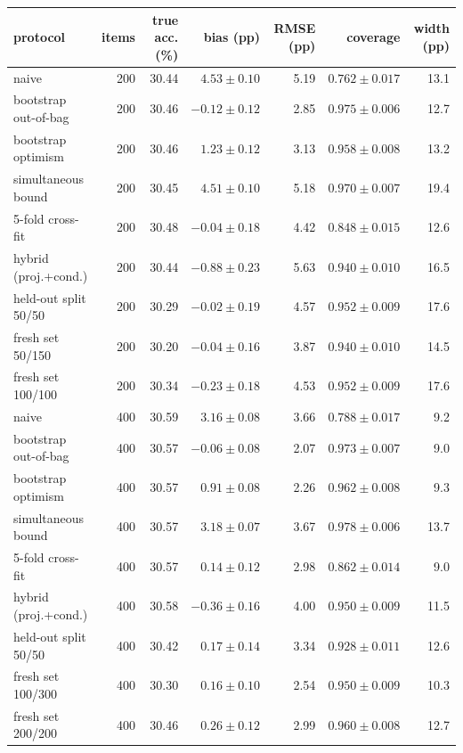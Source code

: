 {\footnotesize\setlength{\tabcolsep}{3.5pt}
\begin{tabular}{lrrrrrr}
\toprule
protocol & items & true acc. (\%) & bias (pp) & RMSE (pp) & coverage & width (pp) \\
\midrule
naive & 200 & 30.44 & $4.53 \pm 0.10$ & 5.19 & $0.762 \pm 0.017$ & 13.1 \\
bootstrap out-of-bag & 200 & 30.46 & $-0.12 \pm 0.12$ & 2.85 & $0.975 \pm 0.006$ & 12.7 \\
bootstrap optimism & 200 & 30.46 & $1.23 \pm 0.12$ & 3.13 & $0.958 \pm 0.008$ & 13.2 \\
simultaneous bound & 200 & 30.45 & $4.51 \pm 0.10$ & 5.18 & $0.970 \pm 0.007$ & 19.4 \\
5-fold cross-fit & 200 & 30.48 & $-0.04 \pm 0.18$ & 4.42 & $0.848 \pm 0.015$ & 12.6 \\
hybrid (proj.+cond.) & 200 & 30.44 & $-0.88 \pm 0.23$ & 5.63 & $0.940 \pm 0.010$ & 16.5 \\
held-out split 50/50 & 200 & 30.29 & $-0.02 \pm 0.19$ & 4.57 & $0.952 \pm 0.009$ & 17.6 \\
fresh set 50/150 & 200 & 30.20 & $-0.04 \pm 0.16$ & 3.87 & $0.940 \pm 0.010$ & 14.5 \\
fresh set 100/100 & 200 & 30.34 & $-0.23 \pm 0.18$ & 4.53 & $0.952 \pm 0.009$ & 17.6 \\
\midrule
naive & 400 & 30.59 & $3.16 \pm 0.08$ & 3.66 & $0.788 \pm 0.017$ & 9.2 \\
bootstrap out-of-bag & 400 & 30.57 & $-0.06 \pm 0.08$ & 2.07 & $0.973 \pm 0.007$ & 9.0 \\
bootstrap optimism & 400 & 30.57 & $0.91 \pm 0.08$ & 2.26 & $0.962 \pm 0.008$ & 9.3 \\
simultaneous bound & 400 & 30.57 & $3.18 \pm 0.07$ & 3.67 & $0.978 \pm 0.006$ & 13.7 \\
5-fold cross-fit & 400 & 30.57 & $0.14 \pm 0.12$ & 2.98 & $0.862 \pm 0.014$ & 9.0 \\
hybrid (proj.+cond.) & 400 & 30.58 & $-0.36 \pm 0.16$ & 4.00 & $0.950 \pm 0.009$ & 11.5 \\
held-out split 50/50 & 400 & 30.42 & $0.17 \pm 0.14$ & 3.34 & $0.928 \pm 0.011$ & 12.6 \\
fresh set 100/300 & 400 & 30.30 & $0.16 \pm 0.10$ & 2.54 & $0.950 \pm 0.009$ & 10.3 \\
fresh set 200/200 & 400 & 30.46 & $0.26 \pm 0.12$ & 2.99 & $0.960 \pm 0.008$ & 12.7 \\
\bottomrule
\end{tabular}}
